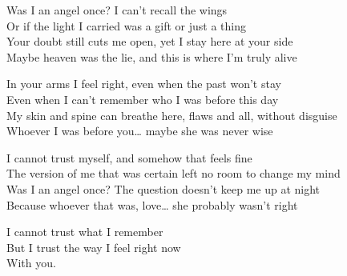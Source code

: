 \begin{lyrics}
Was I an angel once? I can’t recall the wings\\
Or if the light I carried was a gift or just a thing\\
Your doubt still cuts me open, yet I stay here at your side\\
Maybe heaven was the lie, and this is where I’m truly alive

In your arms I feel right, even when the past won’t stay\\
Even when I can’t remember who I was before this day\\
My skin and spine can breathe here, flaws and all, without disguise\\
Whoever I was before you… maybe she was never wise

I cannot trust myself, and somehow that feels fine\\
The version of me that was certain left no room to change my mind\\
Was I an angel once? The question doesn’t keep me up at night\\
Because whoever that was, love… she probably wasn’t right

I cannot trust what I remember\\
But I trust the way I feel right now\\
With you.
\end{lyrics}

